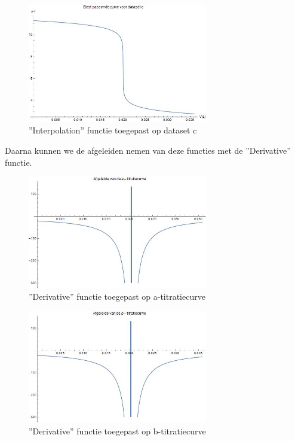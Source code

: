 \documentclass[11pt]{report}
\newcommand{\lbr}{\hfill\break}
\begin{document}
\begin{figure}[H]
    \centering
    \includegraphics[width=0.7\textwidth]{c_interpolation.jpg}
    \caption{''Interpolation'' functie toegepast op dataset c}
\end{figure}
\newpage
Daarna kunnen we de afgeleiden nemen van deze functies met de ''Derivative'' functie.\lbr
\begin{figure}[H]
    \centering
    \includegraphics[width=0.7\textwidth]{a_derivative.jpg}
    \caption{''Derivative'' functie toegepast op a-titratiecurve}
\end{figure}
\begin{figure}[H]
    \centering
    \includegraphics[width=0.7\textwidth]{b_derivative.jpg}
    \caption{''Derivative'' functie toegepast op b-titratiecurve}
\end{figure}
\end{document}
